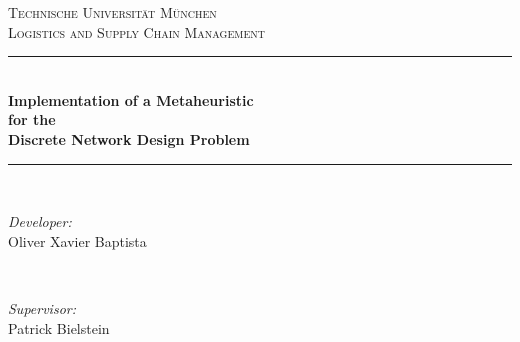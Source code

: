 \begin{titlepage}

\newcommand{\HRule}{\rule{\linewidth}{0.5mm}} %

\center %
 

\textsc{\LARGE Technische Universit{\"a}t M{\"u}nchen}\\[1.5cm] %
\textsc{\Large Logistics and Supply Chain Management}\\[0.5cm] %



\HRule \\[0.4cm]
{ \Large \bfseries Implementation of a Metaheuristic \\for the \\Discrete Network Design Problem}\\[0.5cm] %
\HRule \\[1.5cm]
 

\begin{minipage}{0.4\textwidth}
\begin{flushleft} \large
\emph{Developer:}\\
Oliver Xavier Baptista %
\end{flushleft}
\end{minipage}
~
\begin{minipage}{0.4\textwidth}
\begin{flushright} \large
\emph{Supervisor:} \\
Patrick Bielstein %
\end{flushright}
\end{minipage}\\[2cm]



\end{titlepage}
